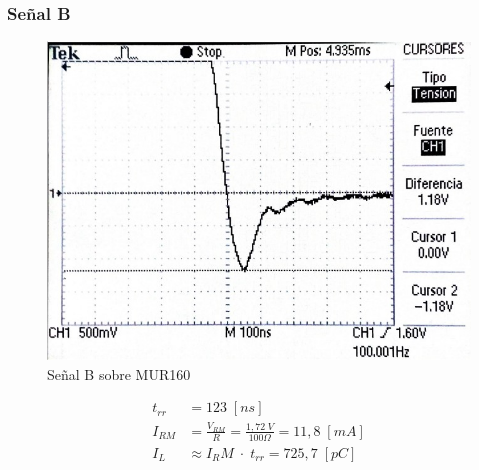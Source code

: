 \documentclass{article}
\begin{document}
\subsubsection{Señal B}
\begin{figure}[h!]
 \begin{center}
	\includegraphics[scale=0.5]{imagenes/MUR_B.jpg} 
	\caption{Señal B sobre MUR160}
 \end{center}
\end{figure}
%
\begin{align*}
	t_{rr} &= 123 \; [ns] \\
	I_{RM}	&= \frac{V_{RM}}{R} = \frac{1,72 \; V}{100 \Omega} = 11,8 \; [mA]\\
	I_L	&\approx {I_RM} \; \cdot \; t_{rr} = 725,7 \; [pC]
\end{align*}
%
\end{document}
